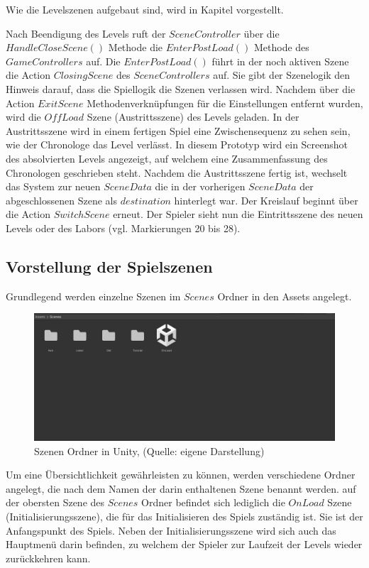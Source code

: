 Wie die Levelszenen aufgebaut sind, wird in Kapitel  vorgestellt.

Nach Beendigung des Levels ruft der $SceneController$ über die $HandleCloseScene()$ Methode die $EnterPostLoad()$ Methode des $GameControllers$ auf. Die $EnterPostLoad()$ führt in der noch aktiven Szene die Action $ClosingScene$ des $SceneControllers$ auf. Sie gibt der Szenelogik den Hinweis darauf, dass die Spiellogik die Szenen verlassen wird. Nachdem über die Action $ExitScene$ Methodenverknüpfungen für die Einstellungen entfernt wurden, wird die $OffLoad$ Szene  (Austrittsszene) des Levels geladen. In der Austrittsszene wird in einem fertigen Spiel eine Zwischensequenz zu sehen sein, wie der Chronologe das Level verlässt. In diesem Prototyp wird ein Screenshot des absolvierten Levels angezeigt, auf welchem eine Zusammenfassung des Chronologen geschrieben steht. Nachdem die Austrittsszene fertig ist, wechselt das System zur neuen $SceneData$ die in der vorherigen $SceneData$ der abgeschlossenen Szene als $destination$ hinterlegt war. Der Kreislauf beginnt über die Action $SwitchScene$ erneut. Der Spieler sieht nun die Eintrittsszene des neuen Levels oder des Labors (vgl. Markierungen 20 bis 28).


\subsection{Vorstellung der Spielszenen}\label{sec:scenes}
Grundlegend werden einzelne Szenen im $Scenes$ Ordner in den Assets angelegt.

\begin{figure}[ht]
\centering
\includegraphics[width=1\linewidth]{content/pictures/Overview.jpg}
\caption{Szenen Ordner in Unity, (Quelle: eigene Darstellung)}
\label{fig:scenes_overview}
\end{figure}

Um eine Übersichtlichkeit gewährleisten zu können, werden verschiedene Ordner angelegt, die nach dem Namen der darin enthaltenen Szene benannt werden. auf der obersten Szene des $Scenes$ Ordner befindet sich lediglich die $OnLoad$ Szene (Initialisierungsszene), die für das Initialisieren des Spiels zuständig ist. Sie ist der Anfangspunkt des Spiels. Neben der Initialisierungsszene wird sich auch das Hauptmenü darin befinden, zu welchem der Spieler zur Laufzeit der Levels wieder zurückkehren kann. 

